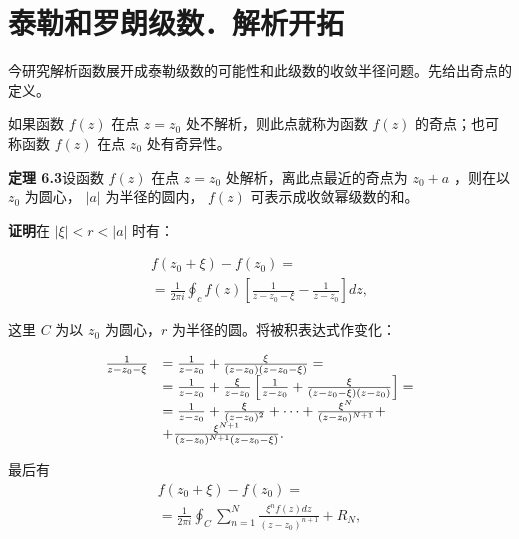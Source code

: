 \section{泰勒和罗朗级数．解析开拓}

今研究解析函数展开成泰勒级数的可能性和此级数的收敛半径问题。先给出奇点的定义。

如果函数 $f(z)$ 在点 $z = z_0$ 处不解析，则此点就称为函数 $f(z)$ 的奇点；也可称函数 $f(z)$ 在点 $z_0$ 处有奇异性。

\textbf{定理 6.3}\quad 设函数 $f(z)$ 在点 $z = z_{0}$ 处解析，离此点最近的奇点为 $z_{0} + a$ ，则在以 $z_{0}$ 为圆心， $|a|$ 为半径的圆内， $f(z)$ 可表示成收敛幂级数的和。

\textbf{证明}\quad 在 $|\xi| < r < |a|$ 时有：

\begin{equation*}
\begin{array}{l} {f (z _ {0} + \xi) - f (z _ {0}) =} \\ {= \frac {1}{2 \pi i} \oint_ {c} f (z) \left[ \frac {1}{z - z _ {0} - \xi} - \frac {1}{z - z _ {0}} \right] d z,} \end{array}
\end{equation*}

这里 $C$ 为以 $z_{0}$ 为圆心，$r$ 为半径的圆。将被积表达式作变化：

\begin{equation*}
\begin{array}{r l} \frac {1}{z - z _ {0} - \xi} & = \frac {1}{z - z _ {0}} + \frac {\xi}{(z - z _ {0}) (z - z _ {0} - \xi)} = \\ & = \frac {1}{z - z _ {0}} + \frac {\xi}{z - z _ {0}} \left[ \frac {1}{z - z _ {0}} + \frac {\xi}{(z - z _ {0} - \xi) (z - z _ {0})} \right] = \\ & = \frac {1}{z - z _ {0}} + \frac {\xi}{(z - z _ {0}) ^ {2}} + \dots + \frac {\xi^ {N}}{(z - z _ {0}) ^ {N + 1}} + \\ & + \frac {\xi^ {N + 1}}{(z - z _ {0}) ^ {N + 1} (z - z _ {0} - \xi)}. \end{array}
\end{equation*}

最后有
\begin{equation*}
\begin{array}{l} f (z _ {0} + \xi) - f (z _ {0}) = \\ = \frac {1}{2 \pi i} \oint_ {C} \sum_ {n = 1} ^ {N} \frac {\xi^ {n} f (z) d z}{(z - z _ {0}) ^ {n + 1}} + R _ {N}, \end{array}\tag{6.7}
\end{equation*}

